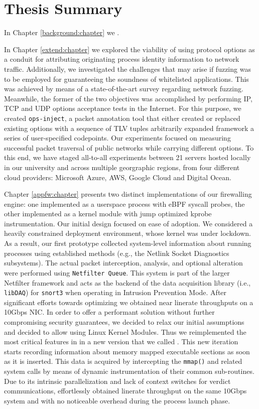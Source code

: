 \section{Thesis Summary}
\label{conclusion:summary}

In Chapter \ref{background:chapter} we .

In Chapter \ref{extend:chapter} we explored the viability of using protocol
options as a conduit for attributing originating process identity information
to network traffic. Additionally, we investigated the challenges that may arise
if fuzzing was to be employed for guaranteeing the soundness of whitelisted
applications. This was achieved by means of a state-of-the-art survey regarding
network fuzzing. Meanwhile, the former of the two objectives was accomplished by
performing IP, TCP and UDP options acceptance tests in the Internet. For this
purpose, we created \texttt{ops-inject}, a packet annotation tool that either
created or replaced existing options with a sequence of TLV tuples arbitrarily expanded
framework a series of user-specified codepoints. Our experiments focused on measuring
successful packet traversal of public networks while carrying different options.
To this end, we have staged all-to-all experiments between 21 servers hosted
locally in our university and across multiple georgraphic regions, from four
different cloud providers: Microsoft Azure, AWS, Google Cloud and Digital Ocean.

Chapter \ref{appfw:chapter} presents two distinct implementations of our
firewalling engine: one implemented as a userspace process with eBPF syscall
probes, the other implemented as a kernel module with jump optimized kprobe
instrumentation. Our initial design focused on ease of adoption. We considered
a heavily constrained deployment environment, whose kernel was under lockdown.
As a result, our first prototype \daf{} collected system-level information about
running processes using established methods (e.g., the Netlink Socket Diagnostics
subsystems). The actual packet interception, analysis, and optional alteration
were performed using \texttt{Netfilter Queue}. This system is part of the larger
Netfilter framework and acts as the backend of the data acquisition library
(i.e., \texttt{libDAQ}) for \texttt{snort3} when operating in Intrusion Prevention
Mode. After significant efforts towards optimizing \daf{} we obtained near linerate
throughputs on a 10Gbps NIC. In order to offer a performant solution without
further compromising security guarantees, we decided to relax our initial
assumptions and decided to allow using Linux Kernel Modules. Thus we reimplemented
the most critical features in \daf{} in a new version that we called \scout{}.
This new iteration starts recording information about memory mapped executable
sections as soon as it is inserted. This data is acquired by intercepting
the \texttt{mmap()} and related system calls by means of dynamic instrumentation
of their common sub-routines. Due to its intrinsic parallelization and lack
of context switches for verdict communications, \scout{} effortlessly obtained
linerate throughput on the same 10Gbps system and with no noticeable overhead
during the process launch phase.

